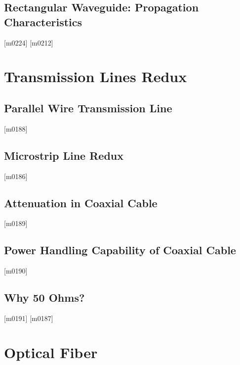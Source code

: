 \documentclass[10pt,letterpaper,twocolumn,openany]{book}
\theoremstyle{definition} %
\begin{document}
    \section{Rectangular Waveguide: Propagation Characteristics}
{\color{blue}\tiny[m0224]}      
      \vfill\break
{\color{blue}\tiny[m0212]}    
  \chapter{Transmission Lines Redux}
  \thispagestyle{fancy} %
  \fancyhf{}            %
    \section{Parallel Wire Transmission Line}
{\color{blue}\tiny[m0188]}      
      \vfill\break
    \section{Microstrip Line Redux}
{\color{blue}\tiny[m0186]}      
      \vfill\break
    \section{Attenuation in Coaxial Cable}
{\color{blue}\tiny[m0189]}      
      \vfill\break
    \section{Power Handling Capability of Coaxial Cable}
{\color{blue}\tiny[m0190]}      
      \vfill\break
    \section{Why 50 Ohms?}
{\color{blue}\tiny[m0191]}      
{\color{blue}\tiny[m0187]}    
  \chapter{Optical Fiber}
  \thispagestyle{fancy} %
  \fancyhf{}            %
\end{document}
